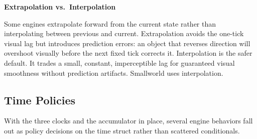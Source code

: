 \documentclass[
  11pt,
  letterpaper,
  DIV=11,
  numbers=noendperiod,
  twoside,
  open=right]{scrreprt}
\begin{document}
\begin{tcolorbox}[enhanced jigsaw, arc=.35mm, bottomrule=.15mm, breakable, colback=white, colframe=quarto-callout-tip-color-frame, left=2mm, leftrule=.75mm, opacityback=0, rightrule=.15mm, toprule=.15mm]
\begin{minipage}[t]{5.5mm}
\textcolor{quarto-callout-tip-color}{\faLightbulb}
\end{minipage}%
\begin{minipage}[t]{\textwidth - 5.5mm}

\vspace{-3mm}\textbf{Extrapolation vs.~Interpolation}\vspace{3mm}

Some engines extrapolate forward from the current state rather than
interpolating between previous and current. Extrapolation avoids the
one-tick visual lag but introduces prediction errors: an object that
reverses direction will overshoot visually before the next fixed tick
corrects it. Interpolation is the safer default. It trades a small,
constant, imperceptible lag for guaranteed visual smoothness without
prediction artifacts. Smallworld uses interpolation.

\end{minipage}%
\end{tcolorbox}

\subsection{Time Policies}\label{time-policies}

With the three clocks and the accumulator in place, several engine
behaviors fall out as policy decisions on the time struct rather than
scattered conditionals.
\end{document}
